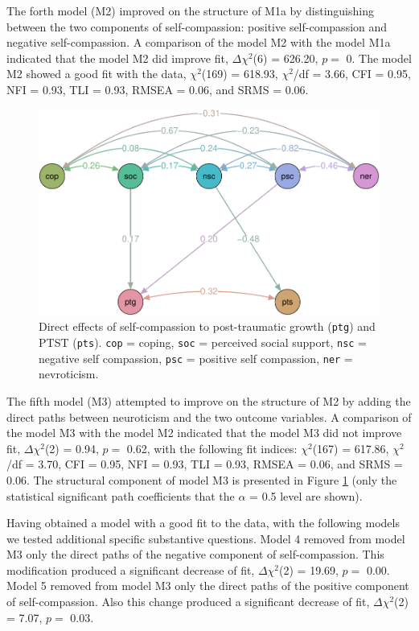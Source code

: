 \documentclass[
  english,
  man,floatsintext]{apa7}
\begin{document}
The forth model (M2) improved on the structure of M1a by distinguishing between the two components of self-compassion: positive self-compassion and negative self-compassion.
A comparison of the model M2 with the model M1a indicated that the model M2 did improve fit, \(\Delta \chi^2\)(6) = 626.20, \(p =\) 0.
The model M2 showed a good fit with the data, \(\chi^2\)(169) = 618.93, \(\chi^2\)/df = 3.66, CFI = 0.95, NFI = 0.93, TLI = 0.93, RMSEA = 0.06, and SRMS = 0.06.

\begin{figure}
\centering
\includegraphics{self_compassion_files/figure-latex/semplot-1.pdf}
\caption{\label{fig:semplot}Direct effects of self-compassion to post-traumatic growth (\texttt{ptg}) and PTST (\texttt{pts}). \texttt{cop} = coping, \texttt{soc} = perceived social support, \texttt{nsc} = negative self compassion, \texttt{psc} = positive self compassion, \texttt{ner} = nevroticism.}
\end{figure}

The fifth model (M3) attempted to improve on the structure of M2 by adding the direct paths between neuroticism and the two outcome variables.
A comparison of the model M3 with the model M2 indicated that the model M3 did not improve fit, \(\Delta \chi^2\)(2) = 0.94, \(p =\) 0.62, with the following fit indices: \(\chi^2\)(167) = 617.86, \(\chi^2\)/df = 3.70, CFI = 0.95, NFI = 0.93, TLI = 0.93, RMSEA = 0.06, and SRMS = 0.06.
The structural component of model M3 is presented in Figure \ref{fig:semplot} (only the statistical significant path coefficients that the \(\alpha\) = 0.5 level are shown).

Having obtained a model with a good fit to the data, with the following models we tested additional specific substantive questions.
Model 4 removed from model M3 only the direct paths of the negative component of self-compassion.
This modification produced a significant decrease of fit, \(\Delta \chi^2\)(2) = 19.69, \(p =\) 0.00.
Model 5 removed from model M3 only the direct paths of the positive component of self-compassion.
Also this change produced a significant decrease of fit, \(\Delta \chi^2\)(2) = 7.07, \(p =\) 0.03.
\end{document}
